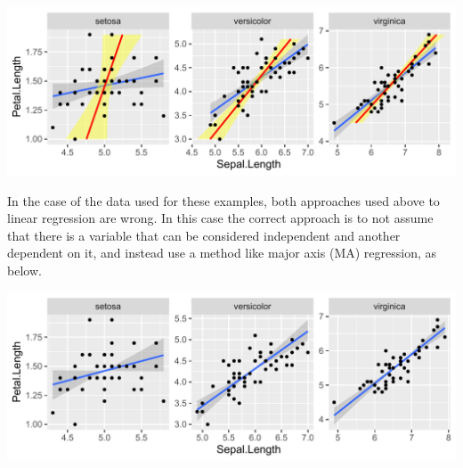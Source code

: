 \documentclass[krantz2]{krantz}\usepackage{knitr}
\begin{document}
\begin{knitrout}\footnotesize
{}\color{fgcolor}\begin{kframe}
\begin{alltt}
 \hlopt{+}
    \hlstd{()} \hlopt{+}
    \hlstd{(}  \hlopt{~}   \hlstd{=} \hlstd{,}  \hlstd{=} \hlstd{)}
\end{alltt}
\end{kframe}

{\centering \includegraphics[width=.99\textwidth]{figure/pos-flipping-07-ggpmisc-1} 

}


\end{knitrout}

In\label{par:ma:example} the case of the  data used for these examples, both approaches used above to linear regression are wrong. In this case the correct approach is to not assume that there is a variable that can be considered independent and another dependent on it, and instead use a method like major axis (MA) regression, as below.

\begin{knitrout}\footnotesize
{}\color{fgcolor}\begin{kframe}
\begin{alltt}
 \hlopt{+} \hlstd{()}
\end{alltt}
\end{kframe}

{\centering \includegraphics[width=.99\textwidth]{figure/pos-flipping-08-ggpmisc-1} 

}


\end{knitrout}
\end{document}

